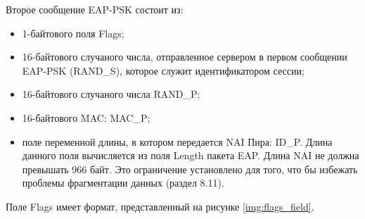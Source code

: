 Второе сообщение EAP-PSK состоит из:

\begin{itemize}
\item 1-байтового поля Flags;
\item 16-байтового случаного числа, отправленное сервером в первом сообщении EAP-PSK (RAND\_S), которое служит идентификатором сессии;
\item 16-байтового случаного числа RAND\_P;
\item 16-байтового MAC: MAC\_P;
\item поле переменной длины, в котором передается NAI Пира: ID\_P. Длина данного поля вычисляется из поля Length пакета EAP. Длина NAI не должна превышать 966 байт. Это ограничение установлено для того, что бы избежать проблемы фрагментации данных (раздел 8.11).
\end{itemize}

Поле Flags имеет формат, представленный на рисунке \ref{img:flags_field}.
